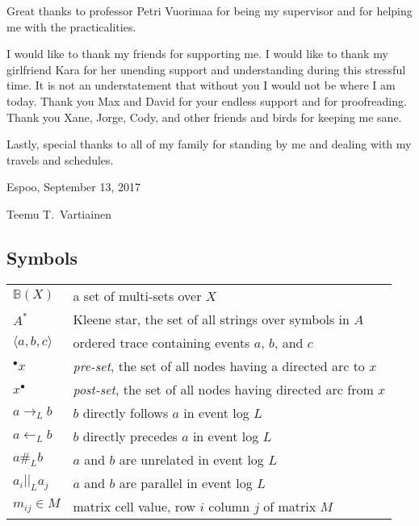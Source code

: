 Great thanks to professor Petri Vuorimaa for being my supervisor and for helping me with the practicalities.

I would like to thank my friends for supporting me.
I would like to thank my girlfriend Kara for her unending support and understanding during this stressful time.
It is not an understatement that without you I would not be where I am today.
Thank you Max and David for your endless support and for proofreading.
Thank you Xane, Jorge, Cody, and other friends and birds for keeping me sane.

Lastly, special thanks to all of my family for standing by me and dealing with my travels and schedules.

\vspace{1cm}
\noindent
Espoo, September 13, 2017

\vspace{5mm}
\noindent
Teemu T.\ Vartiainen

\newpage
\thesistableofcontents


\subsection*{Symbols}

\begin{tabularx}{\linewidth}{l X}
$\mathbb{B}(X)$             & a set of multi-sets over $X$ \\
$A^*$                       & Kleene star, the set of all strings over symbols in $A$ \\
$\langle a,b,c \rangle$     & ordered trace containing events $a$, $b$, and $c$ \\
${}^\bullet x$              & \emph{pre-set}, the set of all nodes having a directed arc to $x$ \\
$x^\bullet$                 & \emph{post-set}, the set of all nodes having directed arc from $x$ \\
$a \rightarrow_L b$         & $b$ directly follows $a$ in event log $L$ \\
$a \leftarrow_L b$          & $b$ directly precedes $a$ in event log $L$ \\
$a \#_L b$                  & $a$ and $b$ are unrelated in event log $L$ \\
$a_i ||_L a_j$              & $a$ and $b$ are parallel in event log $L$ \\
$m_{ij} \in M$              & matrix cell value, row $i$ column $j$ of matrix $M$ \\
\end{tabularx}

